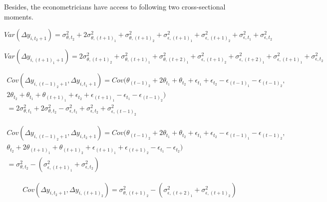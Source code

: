 \documentclass[12pt,notitlepage,onecolumn,aps,pra]{article}
\begin{document}
Besides, the econometricians have access to following two
cross-sectional moments.

\begin{equation}
Var (\Delta y_{i,t_2+1}) =  \sigma^2_{\theta,t_2} + 2\sigma^2_{\theta,(t+1)_1} + \sigma^2_{\theta,(t+1)_2} + \sigma^2_{\epsilon,(t+1)_1} + \sigma^2_{\epsilon,(t+1)_2} + \sigma^2_{\epsilon,t_1} + \sigma^2_{\epsilon,t_2} 
\end{equation}

\begin{equation}
Var (\Delta y_{i,(t+1)_1+1}) =  2\sigma^2_{\theta,(t+1)_2} + \sigma^2_{\theta,(t+1)_1} + \sigma^2_{\theta,(t+2)_1} + \sigma^2_{\epsilon,(t+1)_2} + \sigma^2_{\epsilon,(t+2)_1} + \sigma^2_{\epsilon,(t+1)_1} + \sigma^2_{\epsilon,t_2}
\end{equation}

\begin{equation}
\begin{split}
Cov ( \Delta y_{i,(t-1)_2+1},\Delta y_{i,t_1+1}) = Cov(\theta_{(t-1)_2} + 2\theta_{t_1} + \theta_{t_2} + \epsilon_{t_1} + \epsilon_{t_2} - \epsilon_{(t-1)_1} - \epsilon_{(t-1)_2} , \\
2\theta_{t_2} + \theta_{t_1} + \theta_{(t+1)_1} + \epsilon_{t_2} + \epsilon_{(t+1)_1} - \epsilon_{t_1} - \epsilon_{(t-1)_2 } ) \\
= 2\sigma^2_{\theta,t_1} + 2\sigma^2_{\theta,t_2} - \sigma^2_{\epsilon,t_1} + \sigma^2_{\epsilon,t_2} + \sigma^2_{\epsilon,(t-1)_2}
\end{split}
\end{equation}

\begin{equation}
\begin{split}
Cov ( \Delta y_{i,(t-1)_2+1},\Delta y_{i,t_2+1}) = Cov(\theta_{(t-1)_2} + 2\theta_{t_1} + \theta_{t_2} + \epsilon_{t_1} + \epsilon_{t_2} - \epsilon_{(t-1)_1} - \epsilon_{(t-1)_2} , \\
\theta_{t_2} + 2\theta_{(t+1)_1} + \theta_{(t+1)_2} + \epsilon_{(t+1)_1} + \epsilon_{(t+1)_2} - \epsilon_{t_1} - \epsilon_{t_2} ) \\
= \sigma^2_{\theta,t_2}-(\sigma^2_{\epsilon,(t+1)_1} + \sigma^2_{\epsilon,t_2})
\end{split}
\end{equation}

\begin{equation}
\begin{split}
Cov ( \Delta y_{i,t_2+1},\Delta y_{i,(t+1)_2}) = \sigma^2_{\theta,(t+1)_2}-(\sigma^2_{\epsilon,(t+2)_1} + \sigma^2_{\epsilon,(t+1)_2})
\end{split}
\end{equation}
\end{document}
